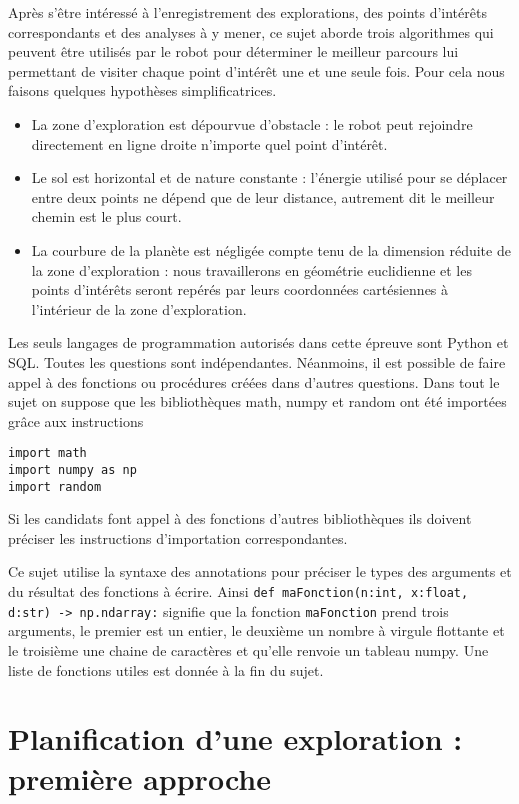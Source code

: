 Après s’être intéressé à l’enregistrement des explorations, des points d’intérêts correspondants et des analyses
à y mener, ce sujet aborde trois algorithmes qui peuvent être utilisés par le robot pour déterminer le meilleur
parcours lui permettant de visiter chaque point d’intérêt une et une seule fois. Pour cela nous faisons quelques
hypothèses simplificatrices.
\begin{itemize}
\item La zone d’exploration est dépourvue d’obstacle : le robot peut rejoindre directement en ligne droite n’importe
quel point d’intérêt.
\item Le sol est horizontal et de nature constante : l’énergie utilisé pour se déplacer entre deux points ne dépend
que de leur distance, autrement dit le meilleur chemin est le plus court.
\item La courbure de la planète est négligée compte tenu de la dimension réduite de la zone d’exploration : nous
travaillerons en géométrie euclidienne et les points d’intérêts seront repérés par leurs coordonnées cartésiennes
à l’intérieur de la zone d’exploration.
\end{itemize}

Les seuls langages de programmation autorisés dans cette épreuve sont Python et SQL. Toutes les questions
sont indépendantes. Néanmoins, il est possible de faire appel à des fonctions ou procédures créées dans d’autres
questions. Dans tout le sujet on suppose que les bibliothèques math, numpy et random ont été importées grâce
aux instructions
\begin{lstlisting}
import math
import numpy as np
import random
\end{lstlisting}
Si les candidats font appel à des fonctions d’autres bibliothèques ils doivent préciser les instructions d’importation
correspondantes.

Ce sujet utilise la syntaxe des annotations pour préciser le types des arguments et du résultat des fonctions à
écrire. Ainsi
\texttt{def maFonction(n:int, x:float, d:str) -> np.ndarray:}
signifie que la fonction \texttt{maFonction} prend trois arguments, le premier est un entier, le deuxième un nombre à
virgule flottante et le troisième une chaine de caractères et qu’elle renvoie un tableau numpy.
Une liste de fonctions utiles est donnée à la fin du sujet.


\section{Planification d’une exploration : première approche}

